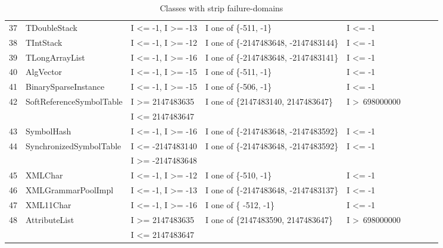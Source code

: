 \documentclass[runningheads,a4paper]{llncs}
\begin{document}
\begin{table}[h]
{{\begin{tabular}{|l|l|l|l|l|l|l|l|l|}
37	& TDoubleStack				& I \textless= -1, I \textgreater= -13			& I one of \{-511, -1\}					& I \textless= -1						\\ 
38	& TIntStack					& I \textless= -1, I \textgreater= -12			& I one of \{-2147483648, -2147483144\}	& I \textless= -1						\\ 
39	& TLongArrayList				& I \textless= -1, I \textgreater= -16			& I one of \{-2147483648, -2147483141\}	& I \textless= -1						\\ 
40	& AlgVector					& I \textless= -1, I \textgreater= -15			& I one of \{-511, -1\}					& I \textless= -1						\\ 
41	& BinarySparseInstance		& I \textless= -1, I \textgreater= -15			& I one of \{-506, -1\}					& I \textless= -1						\\ 
42	& SoftReferenceSymbolTable	& I \textgreater= 2147483635					& I one of \{2147483140, 2147483647\}	& I \textgreater~698000000			\\ 
	&                                             & I \textless= 2147483647					& 										&  			   						\\	
43	& SymbolHash				& I \textless= -1,  I \textgreater= -16			& I one of \{-2147483648, -2147483592\}	& I \textless= -1						\\ 
44	& SynchronizedSymbolTable	& I \textless= -2147483140					& I one of \{-2147483648, -2147483592\}	& I \textless= -1						\\ 
	&                                             & I \textgreater= -2147483648				& 										&  			   						\\
45	& XMLChar					& I \textless= -1, I \textgreater= -12			& I one of \{-510, -1\}					& I \textless= -1						\\
46	& XMLGrammarPoolImpl		& I \textless= -1, I \textgreater= -13			& I one of \{-2147483648, -2147483137\}	& I \textless= -1						\\ 
47	& XML11Char				& I \textless= -1, I \textgreater= -16			& I one of \{ -512, -1\}					& I \textless= -1						\\ 
48	& AttributeList				& I \textgreater= 2147483635				& I one of \{2147483590, 2147483647\}	& I \textgreater~698000000			\\ 
	&                                             & I \textless= 2147483647					& 										&  			   						\\	

\hline
\end{tabular}
}
}
\bigskip
\caption{Classes with strip failure-domains}
\label{table:stripDomains}
\end{table}
\end{document}
